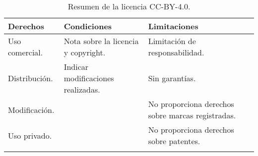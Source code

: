 \begin{longtable}[]{@{}lll@{}}
\toprule
\begin{minipage}[b]{0.17\columnwidth}\raggedright\strut
Derechos\strut
\end{minipage} & \begin{minipage}[b]{0.32\columnwidth}\raggedright\strut
Condiciones\strut
\end{minipage} & \begin{minipage}[b]{0.43\columnwidth}\raggedright\strut
Limitaciones\strut
\end{minipage}\tabularnewline
\midrule
\endhead
\begin{minipage}[t]{0.17\columnwidth}\raggedright\strut
Uso comercial.\strut
\end{minipage} & \begin{minipage}[t]{0.32\columnwidth}\raggedright\strut
Nota sobre la licencia y copyright.\strut
\end{minipage} & \begin{minipage}[t]{0.43\columnwidth}\raggedright\strut
Limitación de responsabilidad.\strut
\end{minipage}\tabularnewline
\begin{minipage}[t]{0.17\columnwidth}\raggedright\strut
Distribución.\strut
\end{minipage} & \begin{minipage}[t]{0.32\columnwidth}\raggedright\strut
Indicar modificaciones realizadas.\strut
\end{minipage} & \begin{minipage}[t]{0.43\columnwidth}\raggedright\strut
Sin garantías.\strut
\end{minipage}\tabularnewline
\begin{minipage}[t]{0.17\columnwidth}\raggedright\strut
Modificación.\strut
\end{minipage} & \begin{minipage}[t]{0.32\columnwidth}\raggedright\strut
\strut
\end{minipage} & \begin{minipage}[t]{0.43\columnwidth}\raggedright\strut
No proporciona derechos sobre marcas registradas.\strut
\end{minipage}\tabularnewline
\begin{minipage}[t]{0.17\columnwidth}\raggedright\strut
Uso privado.\strut
\end{minipage} & \begin{minipage}[t]{0.32\columnwidth}\raggedright\strut
\strut
\end{minipage} & \begin{minipage}[t]{0.43\columnwidth}\raggedright\strut
No proporciona derechos sobre patentes.\strut
\end{minipage}\tabularnewline
\bottomrule
\caption{Resumen de la licencia CC-BY-4.0.}
\end{longtable}

